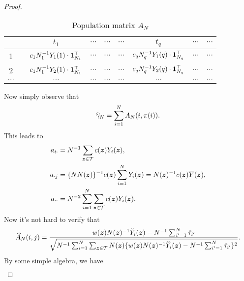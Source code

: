 \documentclass[12pt]{article}
\begin{document}
\begin{proof}
\begin{table}[th]
\centering
\caption{Population matrix $A_{N}$}
\label{tab:potentials}
\begin{tabular}{|c|ccc|c|ccc|c|}
\hline
         &    & \multicolumn{1}{c|}{$t_{1}$}                    & $\cdots$   & $\cdots$ & \multicolumn{1}{c|}{$\cdots$}    & \multicolumn{1}{c|}{$t_{q}$}                                    & {$\cdots$}                                                              & $\cdots$ \\ \hline
1        &  & \multicolumn{1}{c|}{$c_1 N_{1}^{-1}Y_1(1)\cdot{\boldsymbol{1}}^\top_{N_{1}}$} & $\cdots$ & $\cdots$ &  \multicolumn{1}{c|}{$\cdots$} & \multicolumn{1}{c|}{$c_q N_{q}^{-1}Y_1(q)\cdot{\boldsymbol{1}}^\top_{N_{q}}$}  & $\cdots$ & $\cdots$ \\ \hline
2        &  & \multicolumn{1}{c|}{$c_1N_{1}^{-1}Y_2(1)\cdot{\boldsymbol{1}}^\top_{N_{1}}$} & $\cdots$ & $\cdots$ & \multicolumn{1}{c|}{$\cdots$} & \multicolumn{1}{c|}{$c_qN_{q}^{-1}Y_2(q)\cdot{\boldsymbol{1}}^\top_{N_{q}}$} &  $\cdots$ & $\cdots$ \\ \hline
$\cdots$ &  & \multicolumn{1}{c|}{$\cdots$}                     & $\cdots$ & $\cdots$ & \multicolumn{1}{c|}{$\cdots$}                                       & \multicolumn{1}{c|}{$\cdots$} & $\cdots$                                                                                 & $\cdots$ \\ \hline
\end{tabular}
\end{table}
Now simply observe that
\begin{align*}
    {\widehat{\gamma}}_N = \sum_{i=1}^N A_N(i,\pi(i)).
\end{align*}
This leads to
\begin{align*}
    a_{i\cdot} &= N^{-1}\sum_{{\boldsymbol{z}}\in {\mathcal{T}}} c({\boldsymbol{z}})Y_i({\boldsymbol{z}}), \\
    a_{\cdot j} &= \{NN({\boldsymbol{z}})\}^{-1}c({\boldsymbol{z}})\sum_{i=1}^N Y_i({\boldsymbol{z}}) = N({\boldsymbol{z}})^{-1}c({\boldsymbol{z}})\overline{Y}({\boldsymbol{z}}), \\
    a_{\cdot\cdot} &= N^{-2}\sum_{i=1}^N\sum_{{\boldsymbol{z}}\in{\mathcal{T}}} c({\boldsymbol{z}})Y_i({\boldsymbol{z}}).
\end{align*}
Now it's not hard to verify that 
\begin{align*}
    \widehat{A}_N(i,j) =  \frac{w({\boldsymbol{z}})N({\boldsymbol{z}})^{-1}\breve{Y}_i({\boldsymbol{z}}) - N^{-1}\sum_{i'=1}^N\breve{\tau}_{i'}}{\sqrt{N^{-1}\sum_{i=1}^N\sum_{{\boldsymbol{z}}\in{\mathcal{T}}}N({\boldsymbol{z}})\{w({\boldsymbol{z}})N({\boldsymbol{z}})^{-1}\breve{Y}_i({\boldsymbol{z}}) - N^{-1}\sum_{i'=1}^N\breve{\tau}_{i'}\}^2}}.
\end{align*}
By some simple algebra, we have
\begin{align*}

\end{align*}
\end{proof}
\end{document}
